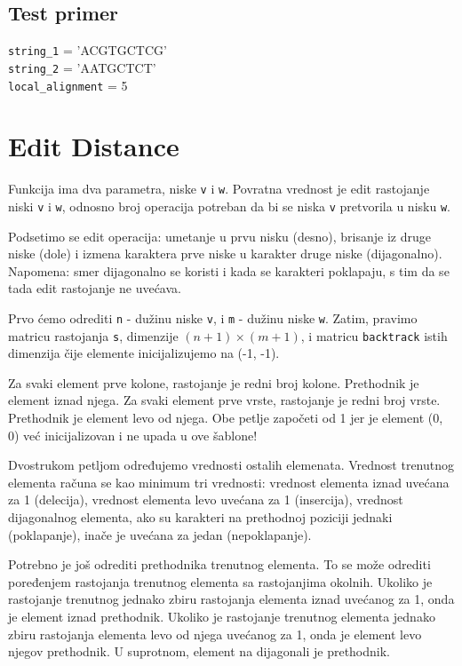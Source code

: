 \subsection{Test primer}

\noindent\texttt{string\_1} = 'ACGTGCTCG'
\\\texttt{string\_2} = 'AATGCTCT'
\\\texttt{local\_alignment} = 5

\section{Edit Distance}

Funkcija ima dva parametra, niske \texttt{v} i \texttt{w}. Povratna vrednost je edit rastojanje niski \texttt{v} i \texttt{w}, odnosno broj operacija potreban da bi se niska \texttt{v} pretvorila u nisku \texttt{w}.

Podsetimo se edit operacija: umetanje u prvu nisku (desno), brisanje iz druge niske (dole) i izmena karaktera prve niske u karakter druge niske (dijagonalno). Napomena: smer dijagonalno se koristi i kada se karakteri poklapaju, s tim da se tada edit rastojanje ne uvećava.

Prvo ćemo odrediti \texttt{n} - dužinu niske \texttt{v}, i \texttt{m} - dužinu niske \texttt{w}. Zatim, pravimo matricu rastojanja \texttt{s}, dimenzije $(n+1) \times (m+1)$, i matricu \texttt{backtrack} istih dimenzija čije elemente inicijalizujemo na (-1, -1). 

Za svaki element prve kolone, rastojanje je redni broj kolone. Prethodnik je element iznad njega. Za svaki element prve vrste, rastojanje je redni broj vrste. Prethodnik je element levo od njega. Obe petlje započeti od 1 jer je element (0, 0) već inicijalizovan i ne upada u ove šablone!

Dvostrukom petljom određujemo vrednosti ostalih elemenata. Vrednost trenutnog elementa računa se kao minimum tri vrednosti: vrednost elementa iznad uvećana za 1 (delecija), vrednost elementa levo uvećana za 1 (insercija), vrednost dijagonalnog elementa, ako su karakteri na prethodnoj poziciji jednaki (poklapanje), inače je uvećana za jedan (nepoklapanje). 

Potrebno je još odrediti prethodnika trenutnog elementa. To se može odrediti poređenjem rastojanja trenutnog elementa sa rastojanjima okolnih. Ukoliko je rastojanje trenutnog jednako zbiru rastojanja elementa iznad uvećanog za 1, onda je element iznad prethodnik. Ukoliko je rastojanje trenutnog elementa jednako zbiru rastojanja elementa levo od njega uvećanog za 1, onda je element levo njegov prethodnik. U suprotnom, element na dijagonali je prethodnik.

